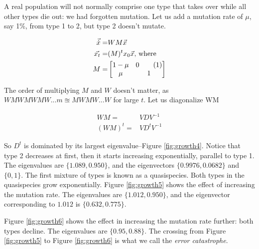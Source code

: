 \documentclass[]{article}
\newcommand\numberthis{\addtocounter{equation}{1}\tag{\theequation}}
\begin{document}
A real population will not normally comprise one type that takes over while all other types die out: we had forgotten mutation. Let us add a mutation rate of $\mu$, say 1\%, from type 1 to 2, but type 2 doesn't mutate.


\begin{align*}
	\vec{\dot{x}} =& W M \vec{x} \\
	\vec{x_t}=& ( M )^t x_0  \vec{x}\text{, where}\\
	M =& \begin{bmatrix}
	1-\mu & 0 \numberthis \label{eq:M}\\
	\mu& 1
	\end{bmatrix}
\end{align*}

The order of multiplying $M$ and $W$ doesn't matter, as $WMWMWMW...m\approxeq MWMW...W$ for large $t$. 	Let us diagonalize WM

\begin{align*}
	WM =& VDV^{-1}\\
	(WM)^t =& V D^t V^{-1}
\end{align*}

So $D^t$ is dominated by its largest eigenvalue--Figure \ref{fig:growth4}. Notice that type 2 decreases at first, then it starts increasing exponentially, parallel to type 1. The eigenvalues are $\{1.089, 0.950\}$, and the eigenvectors $\{0.9976,0.0682\}$ and $\{0,1\}$. The first mixture of types is known as a quasispecies. Both types in the quasispecies grow exponentially. Figure \ref{fig:growth5} shows the effect of increasing the mutation rate. The eigenvalues are $\{1.012, 0.950\}$, and the eigenvector corresponding to $1.012$ is $\{0.632,0.775\}$. 

Figure \ref{fig:growth6} shows the effect in increasing the mutation rate further: both types decline. The eigenvalues are $\{0.95, 0.88\}$. The crossing from Figure \ref{fig:growth5} to Figure \ref{fig:growth6} is what we call the \emph{error catastrophe}.
\end{document}
